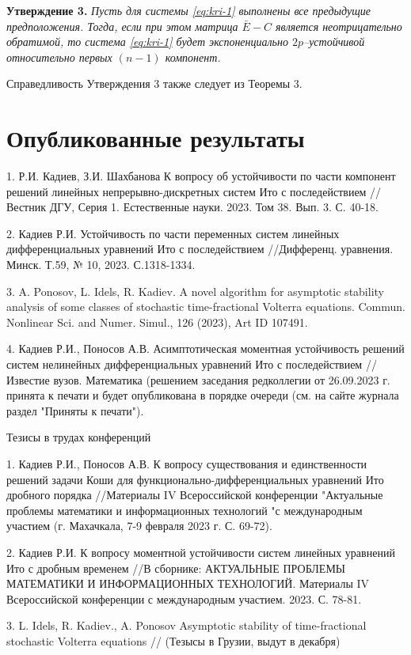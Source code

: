 \textbf {Утверждение 3.} {\it Пусть для системы \eqref{eq:kri-1} выполнены все
предыдущие предположения. Тогда, если при этом матрица $\bar E - C$
является неотрицательно обратимой, то система \eqref{eq:kri-1} будет
экспоненциально $2p$--устойчивой относительно первых $(n-1)$
компонент.}

Справедливость Утверждения 3 также следует из Теоремы 3.


\section{Опубликованные результаты}

1. Р.И. Кадиев, З.И. Шахбанова К вопросу об устойчивости по части
компонент решений линейных непрерывно-дискретных систем Ито с
последействием // Вестник ДГУ, Серия 1. Естественные науки. 2023.
Том 38. Вып. 3. С. 40-18.

2.  Кадиев Р.И. Устойчивость по части переменных систем линейных
дифференциальных уравнений Ито с последействием //Дифференц.
уравнения. Минск. Т.59, № 10, 2023. С.1318-1334.

3. A. Ponosov, L. Idels, R. Kadiev. A novel algorithm for asymptotic
stability analysis of some classes of stochastic time-fractional
Volterra equations. Commun. Nonlinear Sci. and Numer. Simul., 126
(2023), Art ID 107491.

4. Кадиев Р.И., Поносов А.В. Асимптотическая моментная устойчивость
решений систем нелинейных дифференциальных уравнений Ито с
последействием //Известие вузов. Математика (решением заседания
редколлегии от 26.09.2023 г. принята к печати и будет опубликована в
порядке очереди (см. на сайте журнала раздел "Приняты к печати").

Тезисы в трудах конференций

1. Кадиев Р.И., Поносов А.В. К вопросу существования и
единственности решений задачи Коши для
функционально-дифференциальных уравнений Ито дробного порядка
//Материалы IV Всероссийской конференции "Актуальные проблемы
математики и информационных технологий "с международным участием (г.
Махачкала, 7-9 февраля 2023 г. С. 69-72).

2. Кадиев Р.И. К вопросу моментной устойчивости систем линейных
уравнений Ито с  дробным временем //В сборнике: АКТУАЛЬНЫЕ ПРОБЛЕМЫ
МАТЕМАТИКИ И ИНФОРМАЦИОННЫХ ТЕХНОЛОГИЙ. Материалы IV Всероссийской
конференции с международным участием. 2023. С. 78-81.

3. L. Idels, R. Kadiev., A. Ponosov Asymptotic stability of
time-fractional stochastic Volterra equations // (Тезысы в Грузии,
выдут в декабря)



% 

